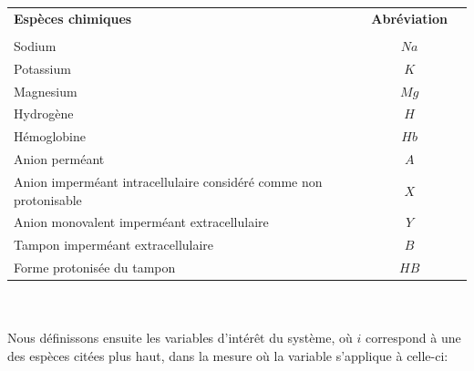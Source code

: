 \documentclass[a4paper,fleqn]{article}
\begin{document}
\begin{tabular}{p{11cm}cr}
\textbf{Espèces chimiques}                                                   & \textbf{Abréviation} \\
\\
Sodium                                                            & ${Na}$   \\
Potassium                                                         & $K$    \\
Magnesium                                                         & ${Mg}$   \\
Hydrogène                                                          & $H$    \\
Hémoglobine                                                       & ${Hb}$   \\
Anion perméant                                                    & $A$    \\
Anion imperméant intracellulaire considéré comme non protonisable & $X$    \\
Anion monovalent imperméant extracellulaire                       & $Y$    \\
Tampon imperméant extracellulaire                                 & $B$    \\
Forme protonisée du tampon                                        & ${HB}$   \\

\end{tabular}\\
\\


Nous définissons ensuite les variables d'intérêt du système, où $i$ correspond à une des espèces citées plus haut, dans la mesure où la variable s'applique à celle-ci: \\
\\
\end{document}
